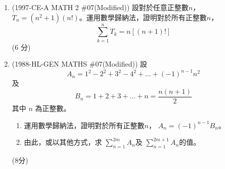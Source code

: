 \documentclass[12pt]{article}
\begin{document}
    \newpage
    \begin{enumerate}
        \item (1997-CE-A MATH 2 \#07(Modified)) 設對於任意正整數$n$，$T_n=(n^2+1)(n!)$。運用數學歸納法，證明對於所有正整數$n$， $$\sum_{k=1}^{n}T_k=n[(n+1)!]$$\hfill(6 分)
        
            \hrulefill
            
            \hrulefill
            
            \hrulefill
            
            \hrulefill
            
            \hrulefill
            
            \hrulefill
            
            \hrulefill
            
            \hrulefill
            
            \hrulefill
            
            \hrulefill
            
            \hrulefill
            
            \hrulefill
            
            \hrulefill
            
            \hrulefill
            
            \hrulefill
            
            \hrulefill
            
            \hrulefill
            
            \hrulefill
            
            \hrulefill
            
            \hrulefill
            
            \hrulefill
            
            \hrulefill
            
            \hrulefill

        \pagebreak
        \item (1988-HL-GEN MATHS \#07(Modified)) 設 $$A_n=1^2-2^2+3^2-4^2+\dots+(-1)^{n-1}n^2$$ 及 $$B_n=1+2+3+\dots+n=\frac{n(n+1)}{2}$$ 其中 $n$ 為正整數。\begin{enumerate}
            \item 運用數學歸納法，證明對於所有正整數$n$， $A_n=(-1)^{n-1}B_n$。
            \item 由此，或以其他方式，求 $\displaystyle\sum_{n=1}^{2m}A_n$及 $\displaystyle\sum_{n=1}^{2m+1}A_n$的值。
        \end{enumerate}\hfill(8分)
        

\end{enumerate}
\end{document}
